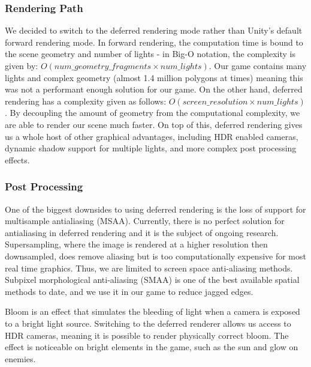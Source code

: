 \documentclass[a4paper,11pt]{article}
\begin{document}
\subsubsection{Rendering Path}
We decided to switch to the deferred rendering mode rather than Unity’s default forward rendering mode. In forward rendering, the computation time is bound to the scene geometry and number of lights - in Big-O notation, the complexity is given by: $O(num\_geometry\_fragments \times num\_lights)$. Our game contains many lights and complex geometry (almost 1.4 million polygons at times) meaning this was not a performant enough solution for our game. On the other hand, deferred rendering has a complexity given as follows\cite{unity_deferred}: $O(screen\_resolution \times num\_lights)$. By decoupling the amount of geometry from the computational complexity, we are able to render our scene much faster. On top of this, deferred rendering gives us a whole host of other graphical advantages, including HDR enabled cameras, dynamic shadow support for multiple lights, and more complex post processing effects.

\subsubsection{Post Processing}
One of the biggest downsides to using deferred rendering is the loss of support for multisample antialiasing (MSAA). Currently, there is no perfect solution for antialiasing in deferred rendering and it is the subject of ongoing research. Supersampling, where the image is rendered at a higher resolution then downsampled, does remove aliasing but is too computationally expensive for most real time graphics. Thus, we are limited to screen space anti-aliasing methods. Subpixel morphological anti-aliasing (SMAA) is one of the best available spatial methods to date, and we use it in our game to reduce jagged edges.

Bloom is an effect that simulates the bleeding of light when a camera is exposed to a bright light source. Switching to the deferred renderer allows us access to HDR cameras, meaning it is possible to render physically correct bloom. The effect is noticeable on bright elements in the game, such as the sun and glow on enemies.
\end{document}
